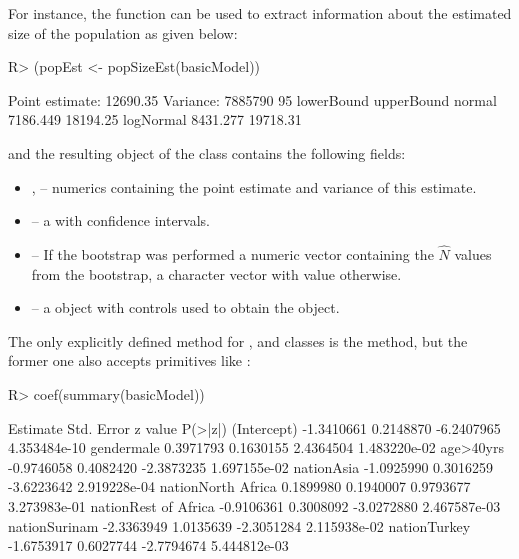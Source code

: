 \documentclass[nojss]{jss}
\newcommand{\1}{\mathcal{I}} \newcommand{\bZero}{\boldsymbol{0}}
\begin{document}
For instance, the  function can be used to extract
information about the estimated size of the population as given below:

\begin{CodeChunk}
\begin{CodeInput}
R> (popEst <- popSizeEst(basicModel))
\end{CodeInput}
\begin{CodeOutput}
Point estimate: 12690.35
Variance: 7885790
95%
          lowerBound upperBound
normal      7186.449   18194.25
logNormal   8431.277   19718.31
\end{CodeOutput}
\end{CodeChunk}

and the resulting object  of the 
class contains the following fields:

\begin{itemize}
  \item {},  -- numerics containing the point estimate and variance of this estimate.
  \item {} -- a  with confidence intervals.
  \item {} -- If the bootstrap was performed a numeric vector containing the $\hat{N}$ values from the bootstrap, a character vector with value  otherwise.
  \item {} -- a  object with controls used to obtain the object.
\end{itemize}

The only explicitly defined method for ,
 and 
classes is the  method, but the former one also accepts
 primitives like :

\begin{CodeChunk}
\begin{CodeInput}
R> coef(summary(basicModel))
\end{CodeInput}
\begin{CodeOutput}
                       Estimate Std. Error    z value      P(>|z|)
(Intercept)          -1.3410661  0.2148870 -6.2407965 4.353484e-10
gendermale            0.3971793  0.1630155  2.4364504 1.483220e-02
age>40yrs            -0.9746058  0.4082420 -2.3873235 1.697155e-02
nationAsia           -1.0925990  0.3016259 -3.6223642 2.919228e-04
nationNorth Africa    0.1899980  0.1940007  0.9793677 3.273983e-01
nationRest of Africa -0.9106361  0.3008092 -3.0272880 2.467587e-03
nationSurinam        -2.3363949  1.0135639 -2.3051284 2.115938e-02
nationTurkey         -1.6753917  0.6027744 -2.7794674 5.444812e-03
\end{CodeOutput}
\end{CodeChunk}
\end{document}
